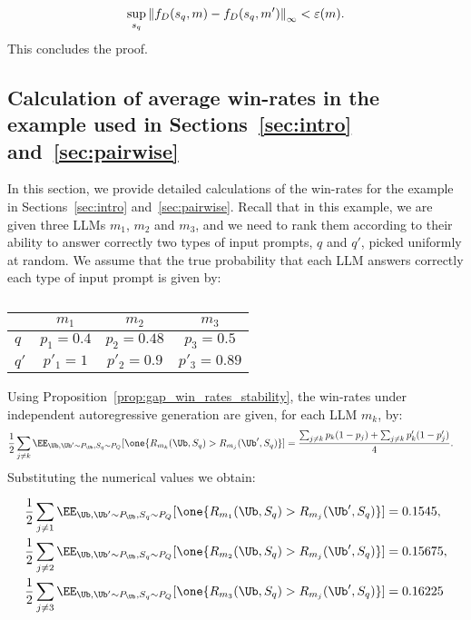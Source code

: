 \begin{equation*}
    \sup_{s_q} \left\lVert f_D(s_q,m)-f_D(s_q, m')\right\rVert_\infty < \varepsilon(m).
\end{equation*}
%
This concludes the proof.






\subsection{Calculation of average win-rates in the example used in Sections~\ref{sec:intro} and~\ref{sec:pairwise}} \label{app:example-ranking}
%
In this section, we provide detailed calculations of the win-rates for the example in Sections~\ref{sec:intro} and~\ref{sec:pairwise}. Recall that in this example, we are given three LLMs $m_1$, $m_2$ and $m_3$, and we need to rank them according to their ability to answer correctly two types of input prompts, $q$ and $q'$, picked uniformly at random.
%
We assume that the true probability that each LLM answers correctly each type of input prompt is given by:
%
\begin{table}[H]
    \centering
    \begin{tabular}{lccc}
        \toprule
         & $m_1$ & $m_2$ & $m_3$ \\
        \midrule
        $q$           & $p_1=0.4$             & $p_2=0.48$           & $p_3=0.5$             \\
        $q'$           & $p'_1=1$           & $p'_2=0.9$         & $p'_3=0.89$              \\
        \bottomrule
 \end{tabular}
 \vspace{-8mm}
 \caption*{}
 \end{table}

Using Proposition~\ref{prop:gap_win_rates_stability}, 
the win-rates under independent autoregressive generation are given, for each LLM $m_k$, by:
\begin{equation}
    \begin{split}
       \frac{1}{2}\sum_{j\neq k}\EE_{\Ub, \Ub' \sim P_{\Ub}, S_q\sim P_Q}[\one\{R_{m_k}(\Ub, S_q)>R_{m_j}(\Ub', S_q)\}] & =\frac{\sum_{j\neq k}p_k(1-p_j) + \sum_{j\neq k}p'_k(1-p'_j)}{4}.
    \end{split}
\end{equation}
%
Substituting the numerical values we obtain:

 \begin{equation}
    \begin{split}
       \frac{1}{2}\sum_{j\neq 1}\EE_{\Ub, \Ub' \sim P_{\Ub}, S_q\sim P_Q}[\one\{R_{m_1}(\Ub, S_q)>R_{m_j}(\Ub', S_q)\}] & =0.1545,\\
       \frac{1}{2}\sum_{j\neq 2}\EE_{\Ub, \Ub' \sim P_{\Ub}, S_q\sim P_Q}[\one\{R_{m_2}(\Ub, S_q)>R_{m_j}(\Ub', S_q)\}] & =0.15675,\\
       \frac{1}{2}\sum_{j\neq 3}\EE_{\Ub, \Ub' \sim P_{\Ub}, S_q\sim P_Q}[\one\{R_{m_3}(\Ub, S_q)>R_{m_j}(\Ub', S_q)\}] & =0.16225\\
    \end{split}
\end{equation}


